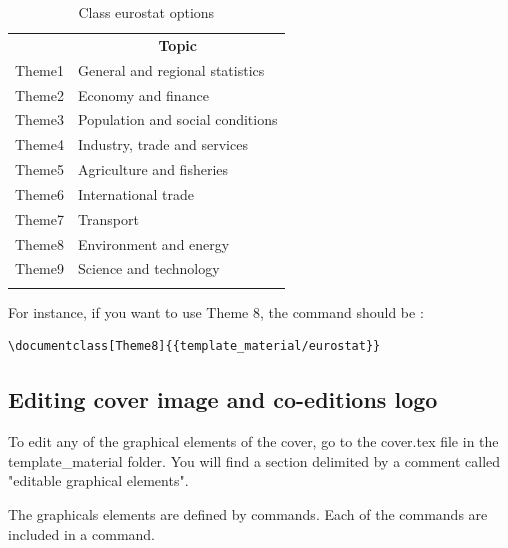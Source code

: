 \documentclass[Theme1]{{template_material/eurostat}}
\begin{document}
\begin{table}[h]
    \caption{Class eurostat options\label{tab_class_options}}
    \begin{tabular}{l|l}
    \hlinesep
    \rowcolor{TH20p}
    \multicolumn{1}{c}{\bf Option} & \multicolumn{1}{c}{\bf Topic}   \\ \hlinesep
    Theme1    & General and regional statistics   \\
    Theme2    & Economy and finance   \\
    Theme3    & Population and social conditions   \\
    Theme4    & Industry, trade and services   \\
    Theme5    & Agriculture and fisheries   \\
    Theme6    & International trade   \\
    Theme7    & Transport   \\
    Theme8    & Environment and energy   \\
    Theme9    & Science and technology   \\ \hlinesep
    \end{tabular}
\end{table}

For instance, if you want to use Theme 8, the   command should be : 

\begin{verbatim}
\documentclass[Theme8]{{template_material/eurostat}}
\end{verbatim}

\subsection{Editing cover image and co-editions logo}

To edit any of the graphical elements of the cover, go to the cover.tex file in the template\_material folder. You will find a section delimited by a comment called "editable graphical elements". 

The graphicals elements are defined by  commands. Each of the  commands are included in a  command. 
\end{document}
